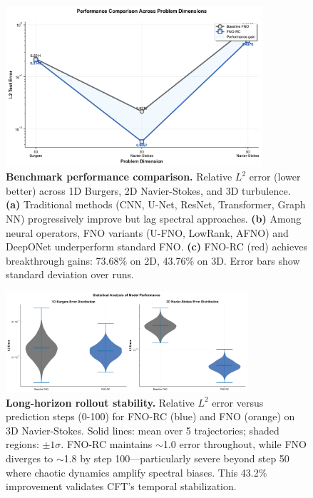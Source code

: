 \documentclass[11pt]{article}
\begin{document}
\begin{figure}[t]
\centering
\includegraphics[width=0.85\textwidth]{figures/performance_comparison.png}
\caption{\textbf{Benchmark performance comparison.} Relative $L^2$ error (lower better) across 1D Burgers, 2D Navier-Stokes, and 3D turbulence. \textbf{(a)} Traditional methods (CNN, U-Net, ResNet, Transformer, Graph NN) progressively improve but lag spectral approaches. \textbf{(b)} Among neural operators, FNO variants (U-FNO, LowRank, AFNO) and DeepONet underperform standard FNO. \textbf{(c)} FNO-RC (red) achieves breakthrough gains: 73.68\% on 2D, 43.76\% on 3D. Error bars show standard deviation over runs.}
\label{fig:performance}
\end{figure}

\begin{figure}[t]
\centering
\includegraphics[width=0.8\textwidth]{figures/long_term_prediction.png}
\caption{\textbf{Long-horizon rollout stability.} Relative $L^2$ error versus prediction steps (0-100) for FNO-RC (blue) and FNO (orange) on 3D Navier-Stokes. Solid lines: mean over 5 trajectories; shaded regions: $\pm 1\sigma$. FNO-RC maintains $\sim$1.0 error throughout, while FNO diverges to $\sim$1.8 by step 100—particularly severe beyond step 50 where chaotic dynamics amplify spectral biases. This 43.2\% improvement validates CFT's temporal stabilization.}
\label{fig:rollout}
\end{figure}
\end{document}
